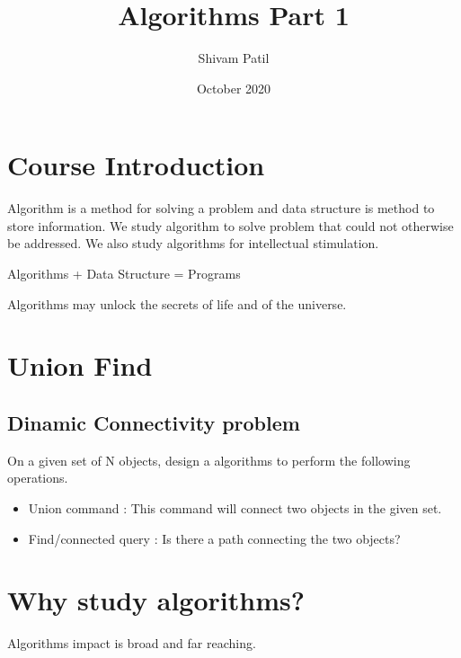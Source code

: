 \documentclass{article}
\title{Algorithms Part 1}
\author{Shivam Patil }
\date{October 2020}
\begin{document}
\maketitle

\section{Course Introduction}
Algorithm is a method for solving a problem and data structure is method to store information.
 We study algorithm to solve problem that could not otherwise be addressed. We also study 
 algorithms for intellectual stimulation.
 
 \begin{center}
     Algorithms + Data Structure = Programs
 \end{center}
 Algorithms may unlock the secrets of life and of the universe.


\section{Union Find}
\subsection{Dinamic Connectivity problem}
On a given set of N objects, design a algorithms to perform the following operations.
\begin{itemize}
    \item Union command : This command will connect two objects in the given set.
    \item Find/connected query : Is there a path connecting the two objects?
\end{itemize}


\section{Why  study algorithms?}
Algorithms impact is broad and far reaching.



\end{document}
